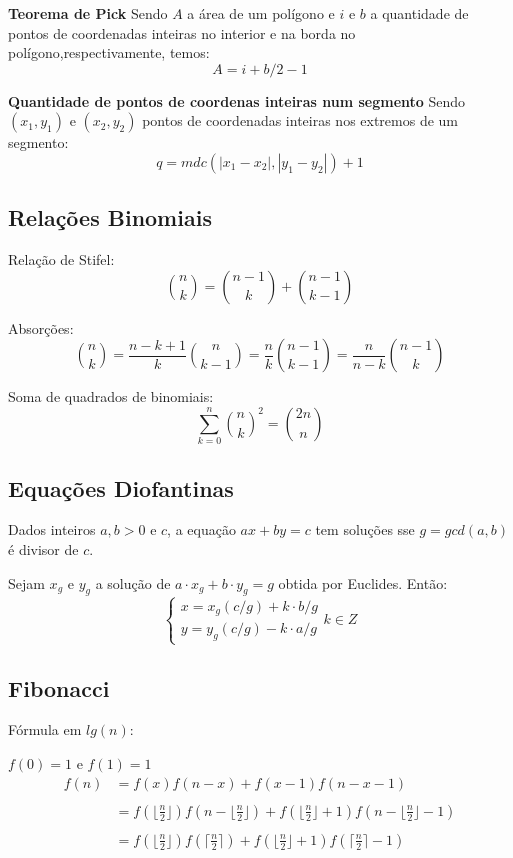   {\bf Teorema de Pick}
  Sendo $A$ a área de um polígono e $i$ e $b$ a quantidade de pontos de coordenadas inteiras
  no interior e na borda no polígono,respectivamente, temos:
  $$
  A = i + b/2 - 1
  $$
 
  {\bf Quantidade de pontos de coordenas inteiras num segmento}
  Sendo $(x_1,y_1)$ e $(x_2,y_2)$ pontos de coordenadas inteiras nos extremos de um segmento:  
  $$
  q = mdc(|x_1 - x_2|, |y_1 - y_2|) + 1
  $$ 

  \subsection{Relações Binomiais}
  Relação de Stifel:
  $$
  {n \choose k} = {n-1 \choose k} + {n-1 \choose k-1}
  $$

  Absorções:
  $$
  {n \choose k} = \frac{n-k+1}{k} {n \choose k-1} = \frac{n}{k} {n-1 \choose k-1} = \frac{n}{n-k} {n-1 \choose k}
  $$

  Soma de quadrados de binomiais:
  $$
  \sum_{k = 0}^{n} {n \choose k}^{2} = {2n \choose n}
  $$

  \subsection{Equações Diofantinas}
  Dados inteiros $a,b > 0$ e $c$, a equação $ax+by=c$ tem soluções sse $g=gcd(a,b)$ é divisor de $c$.
  
  Sejam $x_g$ e $y_g$ a solução de $a \cdot x_g+b \cdot y_g=g$ obtida por Euclides. Então:
  $$
  \left\{
  \begin{array}{ll}
    x=x_g(c/g)+k \cdot b/g \\
    y=y_g(c/g)-k \cdot a/g
  \end{array} \right. k \in Z
  $$
  \subsection{Fibonacci}
  Fórmula em $lg(n)$:


  $f(0) = 1$ e $f(1) = 1$
  $$
  \begin{array}{rl}
    f(n)&= f(x)f(n-x) + f(x-1)f(n-x-1) \\
    &\\
    &= f(\lfloor \frac{n}{2} \rfloor)f(n - \lfloor \frac{n}{2} \rfloor) + f(\lfloor \frac{n}{2} \rfloor +1)f(n - \lfloor \frac{n}{2} \rfloor - 1) \\
    &\\
    &= f(\lfloor \frac{n}{2} \rfloor)f(\lceil \frac{n}{2} \rceil) + f(\lfloor \frac{n}{2} \rfloor +1)f(\lceil \frac{n}{2} \rceil - 1)
  \end{array}
  $$


